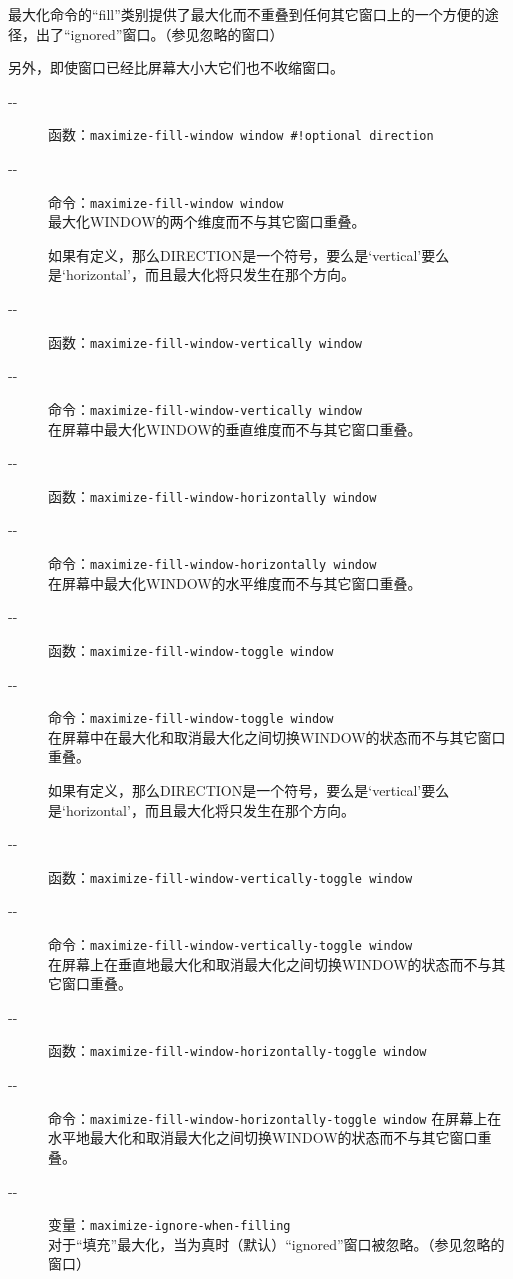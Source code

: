 \documentclass{book}
\begin{document}
\begin{CJK*}{UTF8}{gbsn}
最大化命令的``fill''类别提供了最大化而不重叠到任何其它窗口上的一个方便的途径，出了``ignored''窗口。（参见忽略的窗口）

另外，即使窗口已经比屏幕大小大它们也不收缩窗口。
\begin{description}
\item[-{}-] 函数：\verb|maximize-fill-window window #!optional direction|
\item[-{}-] 命令：\verb|maximize-fill-window window|\\
最大化WINDOW的两个维度而不与其它窗口重叠。

如果有定义，那么DIRECTION是一个符号，要么是`vertical'要么是`horizontal'，而且最大化将只发生在那个方向。
\item[-{}-] 函数：\verb|maximize-fill-window-vertically window|
\item[-{}-] 命令：\verb|maximize-fill-window-vertically window|\\
在屏幕中最大化WINDOW的垂直维度而不与其它窗口重叠。
\item[-{}-] 函数：\verb|maximize-fill-window-horizontally window|
\item[-{}-] 命令：\verb|maximize-fill-window-horizontally window|\\
在屏幕中最大化WINDOW的水平维度而不与其它窗口重叠。
\item[-{}-] 函数：\verb|maximize-fill-window-toggle window|
\item[-{}-] 命令：\verb|maximize-fill-window-toggle window|\\
在屏幕中在最大化和取消最大化之间切换WINDOW的状态而不与其它窗口重叠。

如果有定义，那么DIRECTION是一个符号，要么是`vertical'要么是`horizontal'，而且最大化将只发生在那个方向。
\item[-{}-] 函数：\verb|maximize-fill-window-vertically-toggle window|
\item[-{}-] 命令：\verb|maximize-fill-window-vertically-toggle window|\\
在屏幕上在垂直地最大化和取消最大化之间切换WINDOW的状态而不与其它窗口重叠。
\item[-{}-] 函数：\verb|maximize-fill-window-horizontally-toggle window|
\item[-{}-] 命令：\verb|maximize-fill-window-horizontally-toggle window|
在屏幕上在水平地最大化和取消最大化之间切换WINDOW的状态而不与其它窗口重叠。
\item[-{}-] 变量：\verb|maximize-ignore-when-filling|\\
对于``填充''最大化，当为真时（默认）``ignored''窗口被忽略。（参见忽略的窗口）
\end{description}

\end{CJK*}
\end{document}
